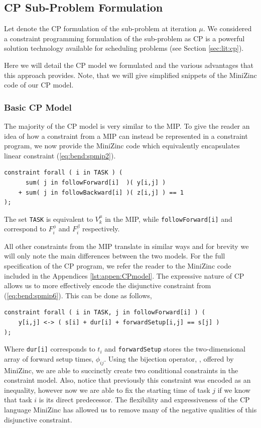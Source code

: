 \subsection{CP Sub-Problem Formulation}
\label{sec:bend:cpForm}
Let \spcp{\mu} denote the CP
formulation of the sub-problem at iteration $\mu$.
We considered a constraint programming formulation
of the sub-problem as CP
is a powerful solution technology available
for scheduling problems (see Section \ref{sec:lit:cp}).

Here we will detail the CP model we formulated
and the various advantages that this approach
provides.
Note, that we will give simplified
snippets of the MiniZinc code of our
CP model.

\subsubsection{Basic CP Model}
\label{sec:bend:cpModel}
The majority of the CP model is very similar
to the MIP.
To give the reader an idea of how a constraint
from a MIP can instead be represented in a constraint program,
we now provide the MiniZinc code which equivalently
encapsulates linear constraint (\ref{eq:bend:spmip2}).
\begin{lstlisting}[language=minizinc]
constraint forall ( i in TASK ) (
      sum( j in followForward[i]  )( y[i,j] )
    + sum( j in followBackward[i] )( z[i,j] ) == 1
);
\end{lstlisting}%
The set {\tt TASK} is equivalent to $V_k^\mu$ in the MIP,
while {\tt followForward[i]} and  correspond to
$F_i^\phi$ and $F_i^\beta$ respectively.

All other constraints from the MIP translate in similar ways and
for brevity we will only note the main differences between the
two models.
For the full specification of the CP program, 
we refer the reader to the MiniZinc code included
in the Appendices \ref{lst:appen:CPmodel}.
The expressive nature of CP allows us to more effectively
encode the disjunctive constraint from (\ref{eq:bend:spmip6}).
This can be done as follows,
\begin{lstlisting}[language=minizinc]
constraint forall ( i in TASK, j in followForward[i] ) (
    y[i,j] <-> ( s[i] + dur[i] + forwardSetup[i,j] == s[j] )
);
\end{lstlisting}%
Where {\tt dur[i]} corresponds to $t_i$ and {\tt forwardSetup}
stores the two-dimensional array of forward setup times, $\phi_{ij}$.
Using the bijection operator, {\tt <->}, offered by MiniZinc,
we are able to succinctly create two conditional constraints
in the constraint model.
Also, notice that previously this constraint was encoded
as an inequality, however now we are able to fix the starting
time of task $j$ if we know that task $i$ is its direct predecessor.
The flexibility and expressiveness of the CP language MiniZinc
has allowed us to remove many of the negative qualities of this disjunctive
constraint.

